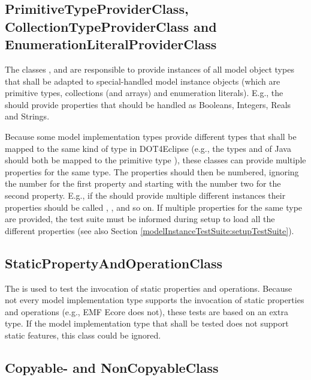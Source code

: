 \subsection{PrimitiveTypeProviderClass, CollectionTypeProviderClass and E\-nu\-me\-ra\-tion\-Li\-te\-ral\-ProviderClass}
\label{modelInstanceTestSuite:specialTypeProviderClasses}

The classes ,  and  are responsible to provide instances of all model object types that shall be adapted to special-handled model instance objects (which are primitive types, collections (and arrays) and enumeration literals). E.g., the  should provide properties that should be handled as Booleans, Integers, Reals and Strings.

Because some model implementation types provide different types that shall be mapped to the same kind of type in \acl{DOT4Eclipse} (e.g., the types  and  of Java should both be mapped to the primitive type ), these classes can provide multiple properties for the same type. The properties should then be numbered, ignoring the number for the first property and starting with the number two for the second property. E.g., if the  should provide multiple different  instances their properties should be called , ,  and so on. If multiple properties for the same type are provided, the test suite must be informed during setup to load all the different properties (see also Section \ref{modelInstanceTestSuite:setupTestSuite}).


\subsection{StaticPropertyAndOperationClass}

The  is used to test the invocation of static properties and operations. Because not every model implementation type supports the invocation of static properties and operations (e.g., \acs{EMF} Ecore does not), these tests are based on an extra type. If the model implementation type that shall be tested does not support static features, this class could be ignored.


\subsection{Copyable- and NonCopyableClass}

